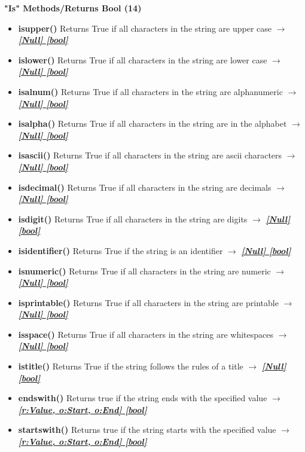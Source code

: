 \documentclass{report}
\begin{document}
      \begin{center}
        \textbf{"Is" Methods/Returns Bool (14)}
      \end{center}
      \bigbreak \noindent 
      \begin{itemize}
        \item[\ding{43}] \textbf{isupper()} Returns True if all characters in the string are upper case $\longrightarrow$ \textbf{\textit{\underline{[Null] [bool]}}}
        \item[\ding{43}] \textbf{islower()}	Returns True if all characters in the string are lower case $\longrightarrow$ \textbf{\textit{\underline{[Null] [bool]}}}
        \item[\ding{43}] \textbf{isalnum()}	Returns True if all characters in the string are alphanumeric $\longrightarrow$ \textbf{\textit{\underline{[Null] [bool]}}}
        \item[\ding{43}] \textbf{isalpha()}	Returns True if all characters in the string are in the alphabet $\longrightarrow$ \textbf{\textit{\underline{[Null] [bool]}}}
        \item[\ding{43}] \textbf{isascii()}	Returns True if all characters in the string are ascii characters $\longrightarrow$ \textbf{\textit{\underline{[Null] [bool]}}}
        \item[\ding{43}] \textbf{isdecimal()}	Returns True if all characters in the string are decimals $\longrightarrow$ \textbf{\textit{\underline{[Null] [bool]}}}
        \item[\ding{43}] \textbf{isdigit()}	Returns True if all characters in the string are digits $\longrightarrow$ \textbf{\textit{\underline{[Null] [bool]}}}
        \item[\ding{43}] \textbf{isidentifier()}	Returns True if the string is an identifier $\longrightarrow$ \textbf{\textit{\underline{[Null] [bool]}}}
        \item[\ding{43}] \textbf{isnumeric()}	Returns True if all characters in the string are numeric $\longrightarrow$ \textbf{\textit{\underline{[Null] [bool]}}}
        \item[\ding{43}] \textbf{isprintable()}	Returns True if all characters in the string are printable $\longrightarrow$ \textbf{\textit{\underline{[Null] [bool]}}}
        \item[\ding{43}] \textbf{isspace()}	Returns True if all characters in the string are whitespaces  $\longrightarrow$ \textbf{\textit{\underline{[Null] [bool]}}}
        \item[\ding{43}] \textbf{istitle()}	Returns True if the string follows the rules of a title $\longrightarrow$ \textbf{\textit{\underline{[Null] [bool]}}}
        \item[\ding{43}] \textbf{endswith()}	Returns true if the string ends with the specified value $\longrightarrow$ \textbf{\textit{\underline{[r:Value, o:Start, o:End] [bool]}}}
        \item[\ding{43}] \textbf{startswith()}	Returns true if the string starts with the specified value $\longrightarrow$ \textbf{\textit{\underline{[r:Value, o:Start, o:End] [bool]}}}
      \end{itemize}
    
\end{document}
